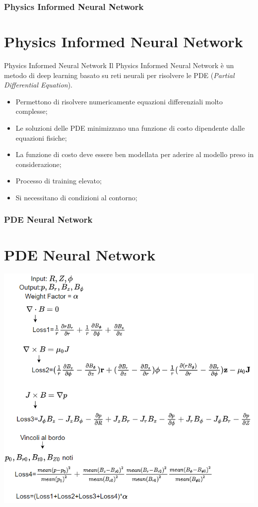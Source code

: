 \documentclass{beamer}
\begin{document}
\begin{frame}
	\frametitle{Physics Informed Neural Network}
	\section{Physics Informed Neural Network}
	\begin{block}{Physics Informed Neural Network}
		Il Physics Informed Neural Network è un metodo di deep learning basato su reti neurali per risolvere le PDE (\emph{Partial Differential Equation}).
	\end{block}
	\begin{itemize}
		\item Permettono di risolvere numericamente equazioni differenziali molto complesse;
		\item Le soluzioni delle PDE minimizzano una funzione di costo dipendente dalle equazioni fisiche;
		\item La funzione di costo deve essere ben modellata per aderire al modello preso in considerazione;
		\item Processo di training elevato;
		\item Si necessitano di condizioni al contorno;
	\end{itemize}
\end{frame}
\begin{frame}
	\frametitle{PDE Neural Network}
	\section{PDE Neural Network}
	\vspace{0.1cm}
		\includegraphics[scale=0.5]{2022-06-07-15-20-48.png}%

\end{frame}
\end{document}
